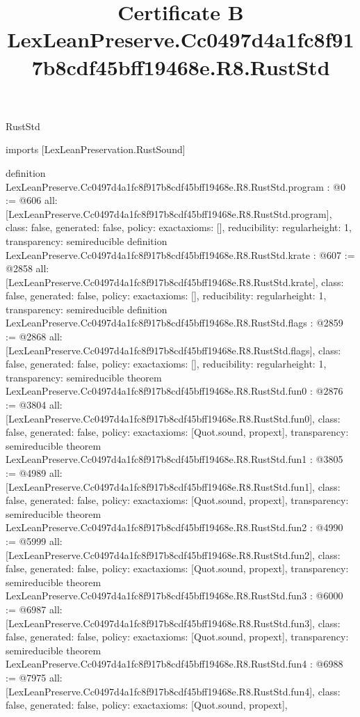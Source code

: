\begin{lexlean}{RustStd}
\title{Certificate B LexLeanPreserve.Cc0497d4a1fc8f917b8cdf45bff19468e.R8.RustStd}
\begin{coremodule}
imports [LexLeanPreservation.RustSound]

definition LexLeanPreserve.Cc0497d4a1fc8f917b8cdf45bff19468e.R8.RustStd.program : @0 := @606 {
  all: [LexLeanPreserve.Cc0497d4a1fc8f917b8cdf45bff19468e.R8.RustStd.program],
  class: false,
  generated: false,
  policy: exact{axioms: []},
  reducibility: regular{height: 1},
  transparency: semireducible
}
definition LexLeanPreserve.Cc0497d4a1fc8f917b8cdf45bff19468e.R8.RustStd.krate : @607 := @2858 {
  all: [LexLeanPreserve.Cc0497d4a1fc8f917b8cdf45bff19468e.R8.RustStd.krate],
  class: false,
  generated: false,
  policy: exact{axioms: []},
  reducibility: regular{height: 1},
  transparency: semireducible
}
definition LexLeanPreserve.Cc0497d4a1fc8f917b8cdf45bff19468e.R8.RustStd.flags : @2859 := @2868 {
  all: [LexLeanPreserve.Cc0497d4a1fc8f917b8cdf45bff19468e.R8.RustStd.flags],
  class: false,
  generated: false,
  policy: exact{axioms: []},
  reducibility: regular{height: 1},
  transparency: semireducible
}
theorem LexLeanPreserve.Cc0497d4a1fc8f917b8cdf45bff19468e.R8.RustStd.fun0 : @2876 := @3804 {
  all: [LexLeanPreserve.Cc0497d4a1fc8f917b8cdf45bff19468e.R8.RustStd.fun0],
  class: false,
  generated: false,
  policy: exact{axioms: [Quot.sound, propext]},
  transparency: semireducible
}
theorem LexLeanPreserve.Cc0497d4a1fc8f917b8cdf45bff19468e.R8.RustStd.fun1 : @3805 := @4989 {
  all: [LexLeanPreserve.Cc0497d4a1fc8f917b8cdf45bff19468e.R8.RustStd.fun1],
  class: false,
  generated: false,
  policy: exact{axioms: [Quot.sound, propext]},
  transparency: semireducible
}
theorem LexLeanPreserve.Cc0497d4a1fc8f917b8cdf45bff19468e.R8.RustStd.fun2 : @4990 := @5999 {
  all: [LexLeanPreserve.Cc0497d4a1fc8f917b8cdf45bff19468e.R8.RustStd.fun2],
  class: false,
  generated: false,
  policy: exact{axioms: [Quot.sound, propext]},
  transparency: semireducible
}
theorem LexLeanPreserve.Cc0497d4a1fc8f917b8cdf45bff19468e.R8.RustStd.fun3 : @6000 := @6987 {
  all: [LexLeanPreserve.Cc0497d4a1fc8f917b8cdf45bff19468e.R8.RustStd.fun3],
  class: false,
  generated: false,
  policy: exact{axioms: [Quot.sound, propext]},
  transparency: semireducible
}
theorem LexLeanPreserve.Cc0497d4a1fc8f917b8cdf45bff19468e.R8.RustStd.fun4 : @6988 := @7975 {
  all: [LexLeanPreserve.Cc0497d4a1fc8f917b8cdf45bff19468e.R8.RustStd.fun4],
  class: false,
  generated: false,
  policy: exact{axioms: [Quot.sound, propext]},
}
\end{coremodule}
\end{lexlean}
